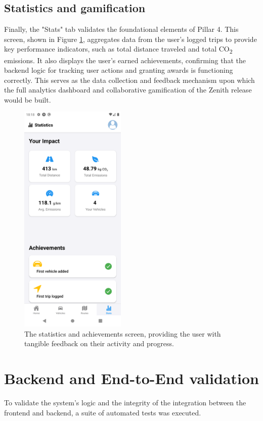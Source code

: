\subsection{Statistics and gamification}
Finally, the "Stats" tab validates the foundational elements of Pillar 4. This screen, shown in Figure \ref{fig:stats-screen}, aggregates data from the user's logged trips to provide key performance indicators, such as total distance traveled and total CO\textsubscript{2} emissions. It also displays the user's earned achievements, confirming that the backend logic for tracking user actions and granting awards is functioning correctly. This serves as the data collection and feedback mechanism upon which the full analytics dashboard and collaborative gamification of the Zenith release would be built.

\begin{figure}[H]
    \centering
    \includegraphics[width=0.45\textwidth]{images/results/stats_screen.png}
    \caption{The statistics and achievements screen, providing the user with tangible feedback on their activity and progress.}
    \label{fig:stats-screen}
\end{figure}

\section{Backend and End-to-End validation}
To validate the system's logic and the integrity of the integration between the frontend and backend, a suite of automated tests was executed.

